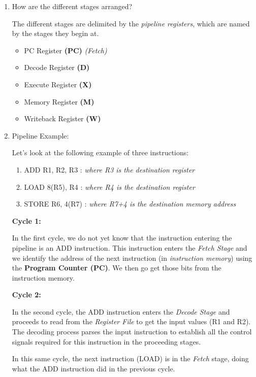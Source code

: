 \documentclass[12pt]{article}
\newenvironment{QandA}{\begin{enumerate}[label=\bfseries\alph*.]\bfseries}
                      {\end{enumerate}}
\newenvironment{answered}{\par\quad\normalfont}{}
\begin{document}
\begin{QandA}
    \item How are the different stages arranged?
    \begin{answered}
    The different stages are delimited by the \textit{pipeline registers}, which are named by the stages they begin at.
    \begin{itemize}
        \item PC Register \textbf{(PC)} \textit{(Fetch)}
        \item Decode Register \textbf{(D)}
        \item Execute Register \textbf{(X)}
        \item Memory Register \textbf{(M)}
        \item Writeback Register \textbf{(W)}
    \end{itemize}
    \end{answered}
    
    \item Pipeline Example:
    \begin{answered}
    Let's look at the following example of three instructions:
    \begin{enumerate}
        \item ADD R1, R2, R3 : \textit{where R3 is the destination register}
        \item LOAD 8(R5), R4 : \textit{where R4 is the destination register}
        \item STORE R6, 4(R7) : \textit{where R7+4 is the destination memory address}
    \end{enumerate}
    
    \textbf{Cycle 1:} 
    
    In the first cycle, we do not yet know that the instruction entering the pipeline is an ADD instruction. This instruction enters the \textit{Fetch Stage} and we identify the address of the next instruction (in \textit{instruction memory}) using the \textbf{Program Counter (PC)}. We then go get those bits from the instruction memory.
    
    \textbf{Cycle 2:} 
    
    In the second cycle, the ADD instruction enters the \textit{Decode Stage} and proceeds to read from the \textit{Register File} to get the input values (R1 and R2). The decoding process parses the input instruction to establish all the control signals required for this instruction in the proceeding stages.
    
    \quad In this same cycle, the next instruction (LOAD) is in the \textit{Fetch} stage, doing what the ADD instruction did in the previous cycle.
    

\end{answered}
\end{QandA}
\end{document}
